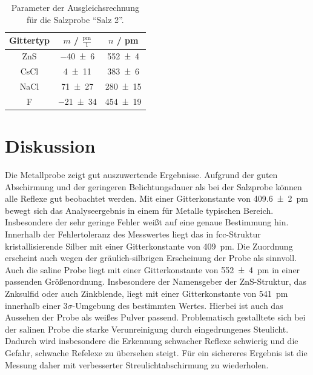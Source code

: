 \begin{table}[H]
  \centering
  \caption{Parameter der Ausgleichsrechnung für die Salzprobe \enquote{Salz 2}.}
  \label{Tab:Salz_Regression}
  \begin{tabular}{c | c c }
    \toprule
    Gittertyp &
    $m$ / $\frac{\mathrm{pm}}{1}$ &
    $n$ / pm \\
    \midrule
    ZnS & \num{-40(6)} & \num{552(4)} \\
    CsCl & \num{4(11)} & \num{383(6)} \\
    NaCl & \num{71(27)} & \num{280(15)} \\
    F & \num{-21(34)} & \num{454(19)} \\
    \bottomrule
  \end{tabular}
\end{table}

\section{Diskussion}
Die Metallprobe zeigt gut auszuwertende Ergebnisse. Aufgrund der guten Abschirmung
und der geringeren Belichtungsdauer als bei der Salzprobe können alle Reflexe gut
beobachtet werden. Mit einer Gitterkonstante von \SI{409.6(20)}{\pico\metre}
bewegt sich das Analyseergebnis in einem für Metalle typischen Bereich.
Insbesondere der sehr geringe Fehler weißt auf eine genaue Bestimmung hin.
Innerhalb der Fehlertoleranz des Messwertes liegt das in fcc-Struktur kristallisierende
Silber mit einer Gitterkonstante von \SI{409}{\pico\metre}\cite{AM}. Die Zuordnung erscheint
auch wegen der gräulich-silbrigen Erscheinung der Probe als sinnvoll.\\
Auch die saline Probe liegt mit einer Gitterkonstante von \SI{552(4)}{\pico\metre}
in einer passenden Größenordnung. Insbesondere der Namensgeber der ZnS-Struktur,
das Znksulfid oder auch Zinkblende, liegt mit einer Gitterkonstante von
\SI{541}{\pico\metre}\cite{AM} innerhalb einer $3\sigma$-Umgebung des bestimmten Wertes.
Hierbei ist auch das Aussehen der Probe als weißes Pulver passend.
Problematisch gestalltete sich bei der salinen Probe die starke Verunreinigung
durch eingedrungenes Steulicht. Dadurch wird insbesondere die Erkennung schwacher
Reflexe schwierig und die Gefahr, schwache Refelexe zu übersehen steigt.
Für ein sichereres Ergebnis ist die Messung daher mit verbesserter Streulichtabschirmung
zu wiederholen.

